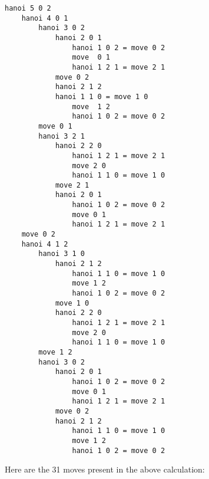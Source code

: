 \documentclass{article}
\theoremstyle{theorem}
\theoremstyle{definition}
\theoremstyle{remark}
\begin{document}
\begin{lstlisting}
hanoi 5 0 2  
    hanoi 4 0 1 
        hanoi 3 0 2
            hanoi 2 0 1 
                hanoi 1 0 2 = move 0 2 
                move  0 1
                hanoi 1 2 1 = move 2 1
            move 0 2  
            hanoi 2 1 2
            hanoi 1 1 0 = move 1 0  
                move  1 2  
                hanoi 1 0 2 = move 0 2
        move 0 1
        hanoi 3 2 1
            hanoi 2 2 0 
                hanoi 1 2 1 = move 2 1
                move 2 0
                hanoi 1 1 0 = move 1 0
            move 2 1 
            hanoi 2 0 1 
                hanoi 1 0 2 = move 0 2
                move 0 1
                hanoi 1 2 1 = move 2 1 
    move 0 2 
    hanoi 4 1 2 
        hanoi 3 1 0
            hanoi 2 1 2 
                hanoi 1 1 0 = move 1 0
                move 1 2
                hanoi 1 0 2 = move 0 2 
            move 1 0
            hanoi 2 2 0
                hanoi 1 2 1 = move 2 1
                move 2 0
                hanoi 1 1 0 = move 1 0
        move 1 2
        hanoi 3 0 2 
            hanoi 2 0 1
                hanoi 1 0 2 = move 0 2
                move 0 1
                hanoi 1 2 1 = move 2 1
            move 0 2
            hanoi 2 1 2
                hanoi 1 1 0 = move 1 0
                move 1 2
                hanoi 1 0 2 = move 0 2
\end{lstlisting}

Here are the 31 moves present in the above calculation:
\end{document}
